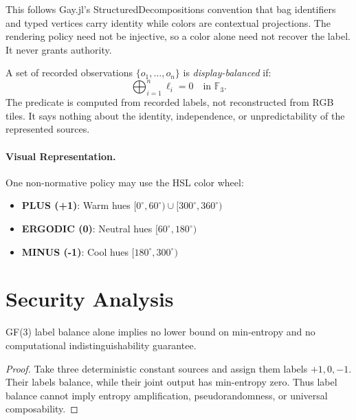 \documentclass[preprint,nohyperxmp]{iacrtrans}
\begin{document}
This follows Gay.jl's StructuredDecompositions convention that bag identifiers
and typed vertices carry identity while colors are contextual projections.
The rendering policy need not be injective, so a color alone need not recover
the label. It never grants authority.

\begin{definition}
A set of recorded observations $\{o_1, \ldots, o_n\}$ is
\emph{display-balanced} if:
\[
\bigoplus_{i=1}^n \ell_i = 0 \quad\text{in }\mathbb F_3.
\]
The predicate is computed from recorded labels, not reconstructed from RGB
tiles. It says nothing about the identity, independence, or unpredictability
of the represented sources.
\end{definition}

\paragraph{Visual Representation.}
One non-normative policy may use the HSL color wheel:
\begin{itemize}
    \item \textbf{PLUS (+1)}: Warm hues $[0^\circ,60^\circ)\cup[300^\circ,360^\circ)$
    \item \textbf{ERGODIC (0)}: Neutral hues $[60^\circ,180^\circ)$
    \item \textbf{MINUS (-1)}: Cool hues $[180^\circ,300^\circ)$
\end{itemize}

\section{Security Analysis}
\label{sec:security}

\begin{proposition}
\label{thm:security}
GF(3) label balance alone implies no lower bound on min-entropy and no
computational indistinguishability guarantee.
\end{proposition}

\begin{proof}
Take three deterministic constant sources and assign them labels $+1,0,-1$.
Their labels balance, while their joint output has min-entropy zero. Thus label
balance cannot imply entropy amplification, pseudorandomness, or universal
composability.
\end{proof}
\end{document}
